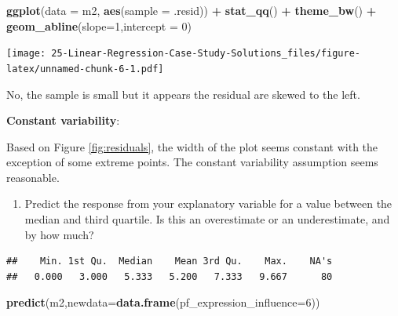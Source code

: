 \documentclass[
]{book}
\newenvironment{Shaded}{\begin{snugshade}}{\end{snugshade}}
\newcommand{\DataTypeTok}[1]{\textcolor[rgb]{0.13,0.29,0.53}{#1}}
\newcommand{\DecValTok}[1]{\textcolor[rgb]{0.00,0.00,0.81}{#1}}
\newcommand{\KeywordTok}[1]{\textcolor[rgb]{0.13,0.29,0.53}{\textbf{#1}}}
\newcommand{\NormalTok}[1]{#1}
\newcommand{\OperatorTok}[1]{\textcolor[rgb]{0.81,0.36,0.00}{\textbf{#1}}}
\newcommand{\StringTok}[1]{\textcolor[rgb]{0.31,0.60,0.02}{#1}}
\providecommand{\tightlist}{%
  \setlength{\itemsep}{0pt}\setlength{\parskip}{0pt}}
\begin{document}
\begin{Shaded}
\begin{Highlighting}[]
\KeywordTok{ggplot}\NormalTok{(}\DataTypeTok{data =}\NormalTok{ m2, }\KeywordTok{aes}\NormalTok{(}\DataTypeTok{sample =}\NormalTok{ .resid)) }\OperatorTok{+}
\StringTok{  }\KeywordTok{stat_qq}\NormalTok{() }\OperatorTok{+}
\StringTok{  }\KeywordTok{theme_bw}\NormalTok{() }\OperatorTok{+}
\StringTok{  }\KeywordTok{geom_abline}\NormalTok{(}\DataTypeTok{slope=}\DecValTok{1}\NormalTok{,}\DataTypeTok{intercept =} \DecValTok{0}\NormalTok{)}
\end{Highlighting}
\end{Shaded}

\texttt{[image: 25-Linear-Regression-Case-Study-Solutions\_files/figure-latex/unnamed-chunk-6-1.pdf]}

No, the sample is small but it appears the residual are skewed to the left.

\textbf{Constant variability}:

Based on Figure \ref{fig:residuals}, the width of the plot seems constant with the exception of some extreme points. The constant variability assumption seems reasonable.

\begin{enumerate}
\def\labelenumi{\alph{enumi}.}
\setcounter{enumi}{5}
\tightlist
\item
  Predict the response from your explanatory variable for a value between the median and third quartile. Is this an overestimate or an underestimate, and by how much?
\end{enumerate}

\begin{Shaded}
\end{Shaded}

\begin{verbatim}
##    Min. 1st Qu.  Median    Mean 3rd Qu.    Max.    NA's 
##   0.000   3.000   5.333   5.200   7.333   9.667      80
\end{verbatim}

\begin{Shaded}
\begin{Highlighting}[]
\KeywordTok{predict}\NormalTok{(m2,}\DataTypeTok{newdata=}\KeywordTok{data.frame}\NormalTok{(}\DataTypeTok{pf_expression_influence=}\DecValTok{6}\NormalTok{))}
\end{Highlighting}
\end{Shaded}
\end{document}
